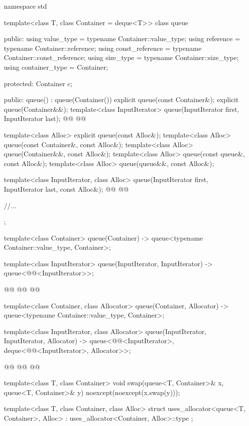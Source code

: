 \documentclass{wg21}
\begin{document}
\begin{codeblock}
namespace std {
    template<class T, class Container = deque<T>>
    class queue {
        public:
        using value_type      = typename Container::value_type;
        using reference       = typename Container::reference;
        using const_reference = typename Container::const_reference;
        using size_type       = typename Container::size_type;
        using container_type  =          Container;

        protected:
        Container c;

        public:
        queue() : queue(Container()) {}
        explicit queue(const Container&);
        explicit queue(Container&&);
        template<class InputIterator>
        queue(InputIterator first, InputIterator last);
        @@
        @@

        template<class Alloc> explicit queue(const Alloc&);
        template<class Alloc> queue(const Container&, const Alloc&);
        template<class Alloc> queue(Container&&, const Alloc&);
        template<class Alloc> queue(const queue&, const Alloc&);
        template<class Alloc> queue(queue&&, const Alloc&);

        template<class InputIterator, class Alloc>
        queue(InputIterator first, InputIterator last, const Alloc&);
        @@
        @@

        //...
    };

    template<class Container>
    queue(Container) -> queue<typename Container::value_type, Container>;

    template<class InputIterator>
    queue(InputIterator, InputIterator) -> queue<@@<InputIterator>>;


    @@
    @@
    @@

    template<class Container, class Allocator>
    queue(Container, Allocator) -> queue<typename Container::value_type, Container>;

    template<class InputIterator, class Allocator>
    queue(InputIterator, InputIterator, Allocator)
    -> queue<@@<InputIterator>, deque<@@<InputIterator>, Allocator>>;

    @@
    @@
    @@

    template<class T, class Container>
    void swap(queue<T, Container>& x, queue<T, Container>& y) noexcept(noexcept(x.swap(y)));

    template<class T, class Container, class Alloc>
    struct uses_allocator<queue<T, Container>, Alloc>
    : uses_allocator<Container, Alloc>::type { };
}
\end{codeblock}
\end{document}
